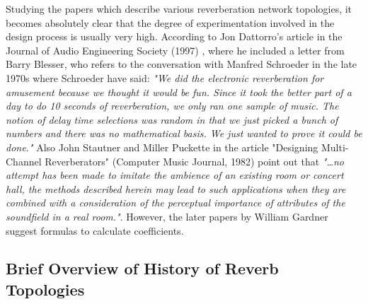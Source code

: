 \documentclass[12pt]{report}
\begin{document}
  Studying the papers which describe various reverberation network topologies,
  it becomes absolutely clear that the degree of experimentation involved in
  the design process is usually very high. According to Jon Dattorro's article
  in the Journal of Audio Engineering Society (1997) \cite{dattorro1997effect},
  where he included a letter from Barry Blesser, who refers to the conversation
  with Manfred Schroeder in the late 1970s where Schroeder have said: \emph{"We
  did the electronic reverberation for amusement because we thought it would be
  fun. Since it took the better part of a day to do 10 seconds of reverberation,
  we only ran one sample of music. The notion of delay time selections was random
  in that we just picked a bunch of numbers and there was no mathematical basis.
  We just wanted to prove it could be done."} Also John Stautner and Miller
  Puckette in the article "Designing Multi-Channel Reverberators" (Computer Music
  Journal, 1982) \cite{puckette1982reverb} point out that \emph{"\dots no attempt
  has been made to imitate the ambience of an existing room or concert hall,
  the methods described herein may lead to such applications when they are
  combined with a consideration of the perceptual importance of attributes of
  the soundfield in a real room."}. However, the later papers by William Gardner
  \cite{gardner1992virtual, gardner1998algorithms} suggest formulas to calculate
  coefficients.


  \subsection{Brief Overview of History of Reverb Topologies}
\end{document}
